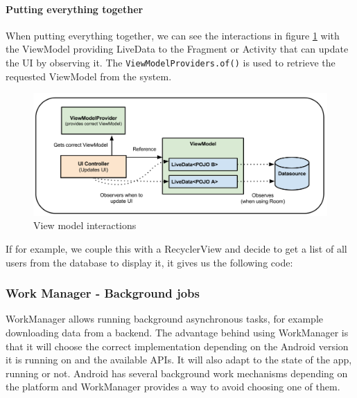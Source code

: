 \documentclass[twoside, openright,11pt,a4paper]{book}
\newenvironment{code}{\captionsetup{type=listing}}{}
\begin{document}
\paragraph{Putting everything together}
When putting everything together\cite{android:codelab:room}, we can see the interactions in figure \ref{viewmodel_interactions_img} with the ViewModel providing LiveData to the Fragment or Activity that can update the UI by observing it. The \verb+ViewModelProviders.of()+ is used to retrieve the requested ViewModel from the system.
\begin{figure}[H]
\begin{center}
	\includegraphics[width=.8\textwidth]{assets/viewmodel}
	\caption[View model interactions]{View model interactions\cite{android:doc:viewmodel}}
	\label{viewmodel_interactions_img}
\end{center}
\end{figure}

If for example, we couple this with a RecyclerView and decide to get a list of all users from the database to display it, it gives us the following code:
\begin{code}
\caption{Using Room, ViewModels and LiveData to display a list of Users}	
\end{code}


\subsubsection{Work Manager - Background jobs}
WorkManager\cite{android:doc:jetpack:work_manager} allows running background asynchronous tasks, for example downloading data from a backend. The advantage behind using WorkManager is that it will choose the correct implementation depending on the Android version it is running on and the available APIs. It will also adapt to the state of the app, running or not. Android has several background work mechanisms depending on the platform and WorkManager provides a way to avoid choosing one of them.\\
\end{document}
